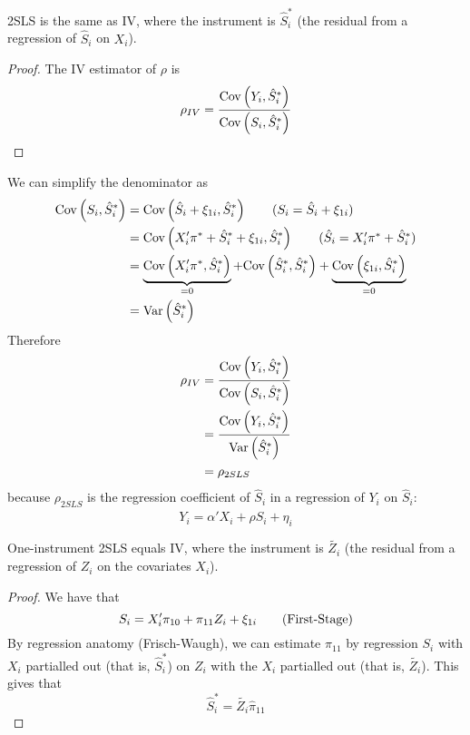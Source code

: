 \documentclass[11pt]{article}
\begin{document}
\begin{theorem}[]
	2SLS is the same as IV, where the instrument is $\hat{S}^*_i$ (the residual from a regression of $\hat{S}_i$ on $X_i$). 
\end{theorem}
\begin{proof}
	The IV estimator of $\rho$ is
	\begin{equation}
		\rho_{IV} = \frac{\text{Cov}\left( Y_i, \hat{S}^*_i \right)}{\text{Cov}\left( S_i, \hat{S}^*_i \right)}
	\end{equation}
\end{proof}
We can simplify the denominator as
\begin{align*}
	\cov{S_i, \hat{S}^*_i} &= \cov{\hat{S}_i + \xi_{1i}, \hat{S}^*_i} \tag{$S_i = \hat{S}_i + \xi_{1i}$}\\
	&= \cov{X'_i \pi^* + \hat{S}^*_i + \xi_{1i}, \hat{S}^*_i} \tag{$\hat{S}_i = X'_i \pi^* + \hat{S}^*_i$}\\
	&= \ub{\cov{X'_i \pi^*,  \hat{S}^*_i}}{= 0} + \cov{ \hat{S}^*_i,  \hat{S}^*_i} + \ub{\cov{\xi_{1i},  \hat{S}^*_i}}{=0} \\
	&= \var{ \hat{S}^*_i }
\end{align*}
Therefore
\begin{align*}
	\rho_{IV} &= \frac{\text{Cov}\left( Y_i, \hat{S}^*_i \right)}{\text{Cov}\left( S_i, \hat{S}^*_i \right)} \\
	&= \frac{\text{Cov}\left( Y_i, \hat{S}^*_i \right)}{\text{Var}\left(  \hat{S}^*_i  \right)} \\
	&= \rho_{2SLS}
\end{align*}
because $\rho_{2SLS}$ is the regression coefficient of $\hat{S}_i$ in a regression of $Y_i$ on $\hat{S}_i$:
\begin{equation}
	Y_i = \alpha'X_i + \rho \hat{S}_i + \eta_i
\end{equation}

\begin{theorem}[]
	One-instrument 2SLS equals IV, where the instrument is $\tilde{Z_i}$ (the residual from a regression of $Z_i$ on the covariates $X_i$).
\end{theorem}
\begin{proof}
	We have that
	\begin{equation}
		S_i = X'_i \pi_{10} + \pi_{11}Z_i + \xi_{1i} \tag{First-Stage}\\
	\end{equation}
	By regression anatomy (Frisch-Waugh), we can estimate $\pi_{11}$ by regression $S_i$ with $X_i$ partialled out (that is, $\hat{S}^*_i$) on $Z_i$ with the $X_i$ partialled out (that is, $\tilde{Z_i}$). This gives that
	\begin{equation}
		\hat{S}^*_i = \tilde{Z_i} \hat{\pi}_{11}
	\end{equation}
\end{proof}
\end{document}
